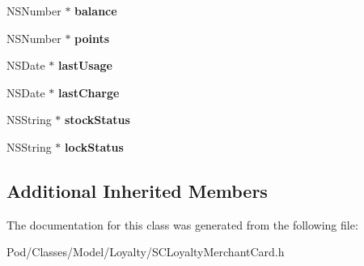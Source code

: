 \begin{DoxyCompactItemize}
\item 
N\+S\+Number $\ast$ {\bfseries balance}\hypertarget{interface_s_c_loyalty_merchant_card_a777b79e7235edbfe612ccfc8172a9c13}{}\label{interface_s_c_loyalty_merchant_card_a777b79e7235edbfe612ccfc8172a9c13}

\item 
N\+S\+Number $\ast$ {\bfseries points}\hypertarget{interface_s_c_loyalty_merchant_card_add3a8c5e62c361d866bffffa2d67f814}{}\label{interface_s_c_loyalty_merchant_card_add3a8c5e62c361d866bffffa2d67f814}

\item 
N\+S\+Date $\ast$ {\bfseries last\+Usage}\hypertarget{interface_s_c_loyalty_merchant_card_ac9b8092a80e391660fcbe0ddcd61b47b}{}\label{interface_s_c_loyalty_merchant_card_ac9b8092a80e391660fcbe0ddcd61b47b}

\item 
N\+S\+Date $\ast$ {\bfseries last\+Charge}\hypertarget{interface_s_c_loyalty_merchant_card_ac4ff374e12ee71e3aca6b08712ce1bca}{}\label{interface_s_c_loyalty_merchant_card_ac4ff374e12ee71e3aca6b08712ce1bca}

\item 
N\+S\+String $\ast$ {\bfseries stock\+Status}\hypertarget{interface_s_c_loyalty_merchant_card_ac3650bd9125ca4e7e97d2cee24d4ea3c}{}\label{interface_s_c_loyalty_merchant_card_ac3650bd9125ca4e7e97d2cee24d4ea3c}

\item 
N\+S\+String $\ast$ {\bfseries lock\+Status}\hypertarget{interface_s_c_loyalty_merchant_card_ad45e19b21a158e35adb0f1d88580d896}{}\label{interface_s_c_loyalty_merchant_card_ad45e19b21a158e35adb0f1d88580d896}

\end{DoxyCompactItemize}
\subsection*{Additional Inherited Members}


The documentation for this class was generated from the following file\+:\begin{DoxyCompactItemize}
\item 
Pod/\+Classes/\+Model/\+Loyalty/S\+C\+Loyalty\+Merchant\+Card.\+h\end{DoxyCompactItemize}
